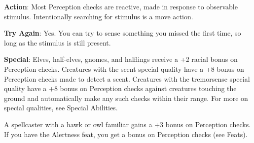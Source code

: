 \textbf{Action}: Most Perception checks are reactive, made in response to observable stimulus. Intentionally searching for stimulus is a move action.
				
\textbf{Try Again}: Yes. You can try to sense something you missed the first time, so long as the stimulus is still present.
				
\textbf{Special}: Elves, half-elves, gnomes, and halflings receive a +2 racial bonus on Perception checks. Creatures with the scent special quality have a +8 bonus on Perception checks made to detect a scent. Creatures with the tremorsense special quality have a +8 bonus on Perception checks against creatures touching the ground and automatically make any such checks within their range. For more on special qualities, see Special Abilities.
				
A spellcaster with a hawk or owl familiar gains a +3 bonus on Perception checks. If you have the Alertness feat, you get a bonus on Perception checks (see Feats).
        	
